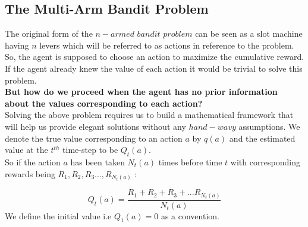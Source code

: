 \documentclass[12pt]{article}
\begin{document}
\subsection{The Multi-Arm Bandit Problem}
 The original form of the $n-armed$ $bandit$ $problem$ can be seen as a slot machine having $n$ levers which will be referred to as actions in reference to the problem. So, the agent is supposed to choose an action to maximize the cumulative reward. If the agent already knew the value of each action it would be trivial to solve this problem. \\

 \noindent
 \textbf{But how do we proceed when the agent has no prior information about the values corresponding to each action?} \\


 \noindent
Solving the above problem requires us to build a mathematical framework that will help us provide elegant solutions without any $hand-wavy$ assumptions. We denote the true value corresponding to an action $a$ by $q(a)$ and the estimated value at the $t^{th}$ time-step to be $Q_{t}(a)$.\\
So if the action $a$ has been taken $N_{t}(a)$ times before time $t$ with corresponding rewards being $R_{1}, R_{2},R_{3}...,R_{N_{t}(a)}$ :
 
\begin{equation}
Q_t(a)=\frac{R_{1}+R_{2}+R_{3}+...R_{N_{t}(a)}}{N_{t}(a)}    
\end{equation}   
We define the initial value i.e $Q_{1}(a)=0$ as a convention.
\end{document}
